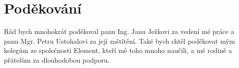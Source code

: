 \section*{Poděkování}

Rád bych mnohokrát poděkoval panu Ing. Janu Ježkovi za vedení mé práce a panu
Mgr. Petru Ustohalovi za její zaštítění. Také bych chtěl poděkovat mým kolegům
ze společnosti Element, kteří mě toho mnoho naučili, a mé rodině a přátelům za
dlouhodobou podporu.

